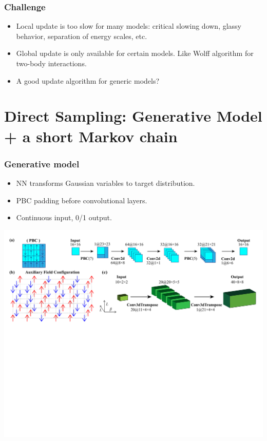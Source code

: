 \documentclass[xcolor=table, 10pt, aspectratio=169, ignorenonframetext]{beamer}
\begin{document}
\begin{frame}
  \frametitle{Challenge}
  \begin{itemize}
    \item Local update is too slow for many models: critical slowing down, glassy behavior, separation of energy scales, etc.
    \item Global update is only available for certain models. Like Wolff algorithm for two-body interactions.
    \item A good update algorithm for generic models?
  \end{itemize}
\end{frame}

\section{Direct Sampling: Generative Model + a short Markov chain}

\begin{frame}
  \frametitle{Generative model}
  \begin{itemize}
  \item NN transforms Gaussian variables to target distribution.
  \item PBC padding before convolutional layers.
  \item Continuous input, 0/1 output.
  \end{itemize}
  \begin{center}
    \includegraphics[width=14cm]{nn-model1}
  \end{center}
\end{frame}
\end{document}
